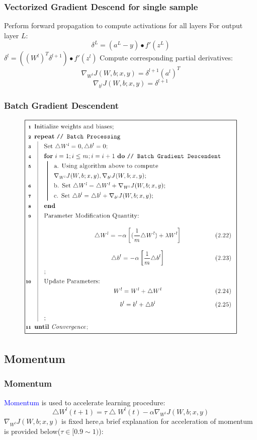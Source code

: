 \documentclass{beamer}
\begin{document}
\begin{CJK*}{UTF8}{gbsn}
\begin{frame}\frametitle{Vectorized Gradient Descend for single sample}
\begin{algorithm}[H]
Perform forward propagation to compute activations for all layers\;
For output layer $L$:
\begin{equation}
\delta^{L}=(a^{L}-y)\bullet f'(z^{L})
\end{equation}
{
    $\delta^l=((W^l)^T\delta^{l+1})\bullet f'(z^l)$\;
}
Compute corresponding partial derivatives:
\begin{equation}
\nabla_{W^l}J(W,b;x,y)=\delta^{l+1}(a^l)^T
\end{equation}
\begin{equation}
\nabla_{b^l}J(W,b;x,y)=\delta^{l+1}
\end{equation}\;
\end{algorithm}
\end{frame}

\begin{frame}\frametitle{Batch Gradient Descendent}
\begin{figure}
\centering
\includegraphics[scale=0.32]{images/algorithm}
\end{figure}
\end{frame}

\subsection{Momentum}
\begin{frame}\frametitle{Momentum}
\textcolor{blue}{Momentum} is used to accelerate learning procedure:
\begin{equation}
\bigtriangleup W^l(t+1)=\tau\bigtriangleup W^l(t)-\alpha\nabla_{W^l}J(W,b;x,y)
\end{equation}
$\nabla_{W^l}J(W,b;x,y)$ is fixed here,a brief explanation for acceleration of momentum is provided below($\tau\in[0.9\sim 1)$):


\end{frame}
\end{CJK*}
\end{document}
